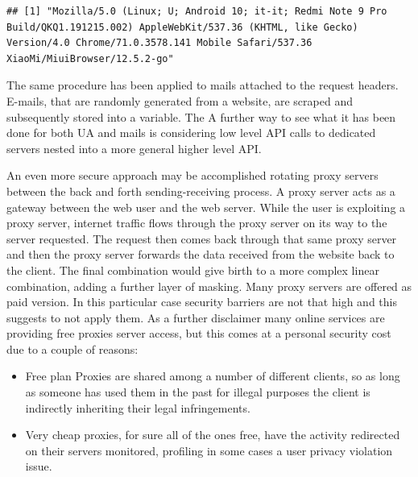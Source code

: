 \documentclass[
  12pt,
  a4paper,
  oneside]{book}
\newenvironment{Shaded}{\begin{snugshade}}{\end{snugshade}}
\newcommand{\DataTypeTok}[1]{\textcolor[rgb]{0.13,0.29,0.53}{#1}}
\newcommand{\DecValTok}[1]{\textcolor[rgb]{0.00,0.00,0.81}{#1}}
\newcommand{\KeywordTok}[1]{\textcolor[rgb]{0.13,0.29,0.53}{\textbf{#1}}}
\newcommand{\NormalTok}[1]{#1}
\newcommand{\OperatorTok}[1]{\textcolor[rgb]{0.81,0.36,0.00}{\textbf{#1}}}
\newcommand{\StringTok}[1]{\textcolor[rgb]{0.31,0.60,0.02}{#1}}
\providecommand{\tightlist}{%
  \setlength{\itemsep}{0pt}\setlength{\parskip}{0pt}}
\theoremstyle{definition}
\theoremstyle{definition}
\theoremstyle{definition}
\theoremstyle{remark}
\begin{document}
\begin{Shaded}
\end{Shaded}

\begin{verbatim}
## [1] "Mozilla/5.0 (Linux; U; Android 10; it-it; Redmi Note 9 Pro Build/QKQ1.191215.002) AppleWebKit/537.36 (KHTML, like Gecko) Version/4.0 Chrome/71.0.3578.141 Mobile Safari/537.36 XiaoMi/MiuiBrowser/12.5.2-go"
\end{verbatim}

The same procedure has been applied to mails attached to the request headers. E-mails, that are randomly generated from a website, are scraped and subsequently stored into a variable. The A further way to see what it has been done for both UA and mails is considering low level API calls to dedicated servers nested into a more general higher level API.

An even more secure approach may be accomplished rotating proxy servers between the back and forth sending-receiving process. A proxy server acts as a gateway between the web user and the web server. While the user is exploiting a proxy server, internet traffic flows through the proxy server on its way to the server requested. The request then comes back through that same proxy server and then the proxy server forwards the data received from the website back to the client. The final combination would give birth to a more complex linear combination, adding a further layer of masking.
Many proxy servers are offered as paid version. In this particular case security barriers are not that high and this suggests to not apply them. As a further disclaimer many online services are providing free proxies server access, but this comes at a personal security cost due to a couple of reasons:

\begin{itemize}
\tightlist
\item
  Free plan Proxies are shared among a number of different clients, so as long as someone has used them in the past for illegal purposes the client is indirectly inheriting their legal infringements.
\item
  Very cheap proxies, for sure all of the ones free, have the activity redirected on their servers monitored, profiling in some cases a user privacy violation issue.
\end{itemize}
\end{document}
